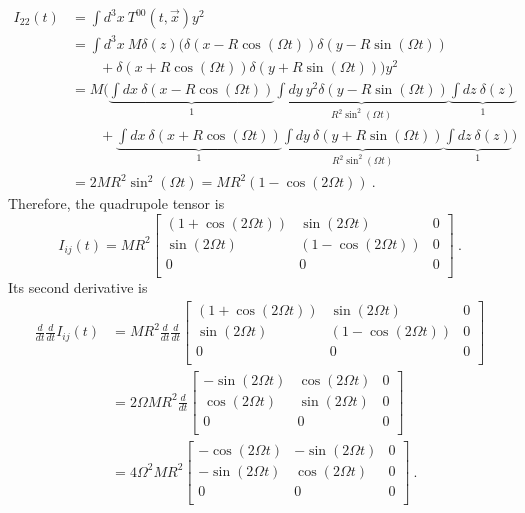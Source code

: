 \documentclass[a4paper]{article}
\newcommand{\dv}[2]{\frac{d#1}{d#2}}
\begin{document}
    \begin{equation*}
    \begin{aligned}
        I_{22} (t) & = \int d^3 x ~ T^{00} (t, \vec x) y^2 \\ & = \int d^3 x ~ M \delta (z) \Big (\delta(x - R \cos (\Omega t))\delta(y - R \sin (\Omega t)) \\ & \qquad + \delta(x + R \cos (\Omega t))\delta(y + R \sin (\Omega t)) \Big ) y^2 \\ & = M \Big ( \underbrace{\int dx ~ \delta (x - R \cos (\Omega t))}_{1} \underbrace{\int dy ~ y^2 \delta (y - R \sin (\Omega t))}_{R^2 \sin^2 (\Omega t)} \underbrace{\int d z ~ \delta (z)}_1 \\ & \qquad + \underbrace{\int dx ~ \delta (x + R \cos (\Omega t))}_{1}\underbrace{\int dy ~ \delta (y + R \sin (\Omega t))}_{R^2 \sin^2(\Omega t)} \underbrace{\int d z ~ \delta (z)}_1 \Big ) \\ & = 2 M R^2 \sin^2 (\Omega t) = M R^2 (1 - \cos (2 \Omega t)) ~.
    \end{aligned}
    \end{equation*}
    Therefore, the quadrupole tensor is 
    \begin{equation}\label{quadsys}
        I_{ij} (t) = MR^2 \begin{bmatrix}
            (1 + \cos (2 \Omega t)) & \sin (2 \Omega t) & 0 \\
            \sin (2 \Omega t) & (1 - \cos (2 \Omega t)) & 0 \\
            0 & 0 & 0 \\
        \end{bmatrix} ~.
    \end{equation}
    Its second derivative is 
    \begin{equation*}
    \begin{aligned}
        \dv{}{t} \dv{}{t} I_{ij} (t) & = MR^2 \dv{}{t} \dv{}{t} \begin{bmatrix}
            (1 + \cos (2 \Omega t)) & \sin (2 \Omega t) & 0 \\
            \sin (2 \Omega t) & (1 - \cos (2 \Omega t)) & 0 \\
            0 & 0 & 0 \\
        \end{bmatrix} \\ & = 2 \Omega MR^2 \dv{}{t} \begin{bmatrix}
            - \sin (2 \Omega t) & \cos (2 \Omega t) & 0 \\
            \cos (2 \Omega t) & \sin (2 \Omega t) & 0 \\
            0 & 0 & 0 \\
        \end{bmatrix} \\ & = 4 \Omega^2 MR^2 \begin{bmatrix}
            - \cos (2 \Omega t) & -\sin (2 \Omega t) & 0 \\
            -\sin (2 \Omega t) & \cos (2 \Omega t) & 0 \\
            0 & 0 & 0 \\
        \end{bmatrix}~.
    \end{aligned}
    \end{equation*}
\end{document}
